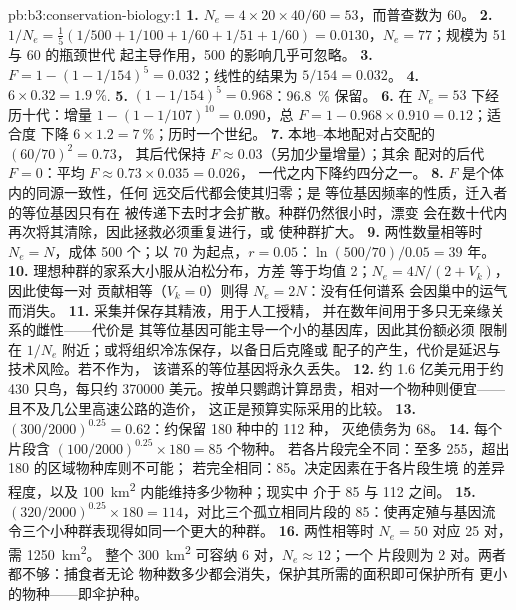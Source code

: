 \begin{solution}{pb:b3:conservation-biology:1}
\textbf{1.} $N_{e} = 4\times 20\times 40/60 = 53$，而普查数为 60。
\textbf{2.} $1/N_{e} = \tfrac{1}{5}(1/500 + 1/100 + 1/60 + 1/51 + 1/60) =
0.0130$，$N_{e} = 77$；规模为 51 与 60 的瓶颈世代
起主导作用，500 的影响几乎可忽略。
\textbf{3.} $F = 1 - (1 - 1/154)^{5} = 0.032$；线性的结果为 $5/154 = 0.032$。
\textbf{4.} $6\times 0.32 = \qty{1.9}{\%}$.
\textbf{5.} $(1 - 1/154)^{5} = 0.968$：\qty{96.8}{\%} 保留。
\textbf{6.} 在 $N_{e} = 53$ 下经历十代：增量 $1 - (1 -
1/107)^{10} = 0.090$，总 $F = 1 - 0.968\times 0.910 = 0.12$；适合度
下降 $6\times 1.2 = \qty{7}{\%}$；历时一个世纪。
\textbf{7.} 本地–本地配对占交配的 $(60/70)^{2} = 0.73$，
其后代保持 $F \approx 0.03$（另加少量增量）；其余
配对的后代 $F = 0$：平均 $F \approx 0.73\times 0.035 = 0.026$，
一代之内下降约四分之一。
\textbf{8.} $F$ 是个体内的同源一致性，任何
远交后代都会使其归零；是
等位基因频率的性质，迁入者的等位基因只有在
被传递下去时才会扩散。种群仍然很小时，漂变
会在数十代内再次将其清除，因此拯救必须重复进行，或
使种群扩大。
\textbf{9.} 两性数量相等时 $N_{e} = N$，成体 500 个；以 70 为起点，$r =
0.05$：$\ln(500/70)/0.05 = 39$ 年。
\textbf{10.} 理想种群的家系大小服从泊松分布，方差
等于均值 2；$N_{e} = 4N/(2 + V_{k})$，因此使每一对
贡献相等（$V_{k} = 0$）则得 $N_{e} = 2N$：没有任何谱系
会因巢中的运气而消失。
\textbf{11.} 采集并保存其精液，用于人工授精，
并在数年间用于多只无亲缘关系的雌性——代价是
其等位基因可能主导一个小的基因库，因此其份额必须
限制在 $1/N_{e}$ 附近；或将组织冷冻保存，以备日后克隆或
配子的产生，代价是延迟与技术风险。若不作为，
该谱系的等位基因将永久丢失。
\textbf{12.} 约 1.6 亿美元用于约 430 只鸟，每只约
\num{370000} 美元。按单只鹦鹉计算昂贵，相对一个物种则便宜——
且不及几公里高速公路的造价，
这正是预算实际采用的比较。
\textbf{13.} $(300/2000)^{0.25} = 0.62$：约保留 180 种中的 112 种，
灭绝债务为 68。
\textbf{14.} 每个片段含 $(100/2000)^{0.25}\times 180 = 85$ 个物种。
若各片段完全不同：至多 255，超出 180 的区域物种库则不可能；
若完全相同：85。决定因素在于各片段生境
的差异程度，以及 \qty{100}{km^2} 内能维持多少物种；现实中
介于 85 与 112 之间。
\textbf{15.} $(320/2000)^{0.25}\times 180 = 114$，对比三个孤立相同片段的
85：使再定殖与基因流
令三个小种群表现得如同一个更大的种群。
\textbf{16.} 两性相等时 $N_{e} = 50$ 对应 25 对，需 \qty{1250}{km^2}。
整个 \qty{300}{km^2} 可容纳 6 对，$N_{e} \approx 12$；一个
片段则为 2 对。两者都不够：捕食者无论
物种数多少都会消失，保护其所需的面积即可保护所有
更小的物种——即伞护种。

\end{solution}
